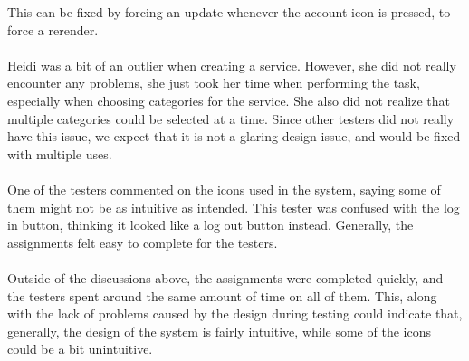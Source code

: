 This can be fixed by forcing an update whenever the account icon is pressed, to force a rerender.
\\\\
Heidi was a bit of an outlier when creating a service.
However, she did not really encounter any problems, she just took her time when performing the task, especially when choosing categories for the service.
She also did not realize that multiple categories could be selected at a time.
Since other testers did not really have this issue, we expect that it is not a glaring design issue, and would be fixed with multiple uses.
\\\\
One of the testers commented on the icons used in the system, saying some of them might not be as intuitive as intended.
This tester was confused with the log in button, thinking it looked like a log out button instead.
Generally, the assignments felt easy to complete for the testers.
\\\\
Outside of the discussions above, the assignments were completed quickly, and the testers spent around the same amount of time on all of them.
This, along with the lack of problems caused by the design during testing could indicate that, generally, the design of the system is fairly intuitive, while some of the icons could be a bit unintuitive. 
